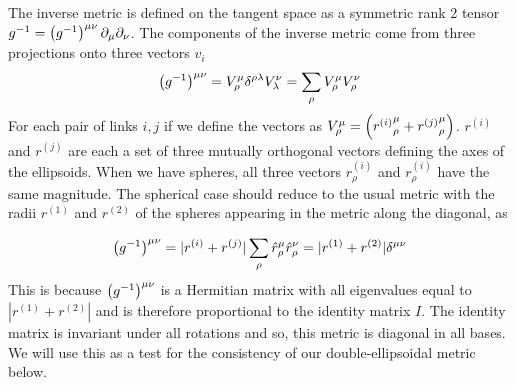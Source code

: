 \documentclass[nofootinbib,preprint,floatfix,titlepage,superscriptaddress]{revtex4} %
\begin{document}
The inverse metric is defined on the tangent space as a symmetric rank 2 tensor $ g^{-1} = \left(g^{-1}\right)^{\mu\nu}\partial_\mu \partial_\nu $. 
The components of the inverse metric  come from three projections onto three vectors $v_i$
\begin{equation}
    \left(g^{-1}\right)^{\mu\nu} = V^\mu_\rho \delta^{\rho \lambda} V^\nu_\lambda =  \sum_{\rho} V_\rho^\mu V_\rho^\nu \label{eq:ginv}
\end{equation}
For each pair of links $i,j$ if we define the vectors as $V_\rho^\mu =%
\pr{{r^{(i)}}_{\rho}^\mu+{r^{(j)}}_{\rho}^\mu} $. 
$r^{(i)}$ and $r^{(j)}$ are each a set of three mutually orthogonal vectors defining the axes of the ellipsoids. 
When we have spheres, all three vectors $r^{(i)}_\rho$ and $r^{(i)}_\rho$ have the same magnitude. 
The spherical case should reduce to the usual metric with the radii $r^{(1)}$ and $r^{(2)}$ of the spheres appearing in the metric along the diagonal, as 

$$ \left(g^{-1}\right)^{\mu\nu} = |r^{(i)}+r^{(j)}|\sum_{\rho} \hat{r}_\rho^\mu \hat{r}_\rho^\nu = |r^{(1)}+r^{(2)}| \delta^{\mu\nu }$$
This is because $ \left(g^{-1}\right)^{\mu\nu} $ is a Hermitian matrix with all eigenvalues equal to $|r^{(1)}+r^{(2)}|$ and is therefore proportional to the identity matrix $I$. The identity matrix is invariant under all rotations and so, this metric is diagonal in all bases.
We will use this as a test for the consistency of our double-ellipsoidal metric below. 
 
\end{document}
